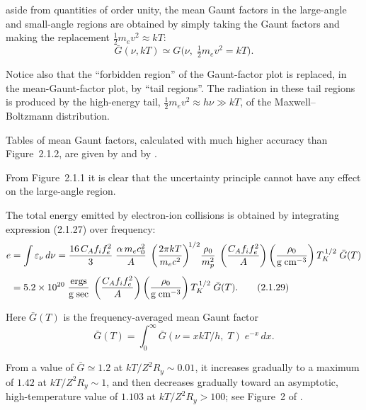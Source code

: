 aside from quantities of order unity, the mean Gaunt factors in the large-angle
and small-angle regions are obtained by simply taking the Gaunt
factors and making the replacement $\frac{1}{2}m_e v^2 \approx kT$:
\begin{equation}
\bar{G}(\nu,kT) \simeq G\bigl(\nu,\;\tfrac{1}{2}m_e v^2 = kT\bigr).
\end{equation}

Notice also that the ``forbidden region'' of the Gaunt-factor plot is replaced, in
the mean-Gaunt-factor plot, by ``tail regions''.  The radiation in these tail regions
is produced by the high-energy tail, $\frac{1}{2}m_e v^2 \approx h\nu \gg kT$, of the Maxwell--Boltzmann
distribution.

Tables of mean Gaunt factors, calculated with much higher accuracy than
Figure~2.1.2, are given by \citet{Green1959} and by \citet{Karzas1961}.

From Figure~2.1.1 it is clear that the uncertainty principle cannot have any
effect on the large-angle region.


The total energy emitted by electron-ion collisions is obtained by integrating
expression (2.1.27) over frequency:
\begin{align}
e &= \int \varepsilon_\nu\,d\nu
= \frac{16\,C_A f_i f_e^2}{3}\;
\frac{\alpha\,m_e c^2_0}{A}\;
\left(\frac{2\pi kT}{m_e c^2}\right)^{\!1/2}\!
\frac{\rho_0}{m_p^2}\;
\left(\frac{C_A f_i f_e^2}{A}\right)
\left(\frac{\rho_0}{\text{g\;cm}^{-3}}\right)
T_K^{\,1/2}\;\bar{G}(T)
\notag\\[4pt]
&= 5.2 \times 10^{20}\;
\frac{\text{ergs}}{\text{g\;sec}}\;
\left(\frac{C_A f_i f_e^2}{A}\right)
\left(\frac{\rho_0}{\text{g\;cm}^{-3}}\right)
T_K^{\,1/2}\;\bar{G}(T).
\tag{2.1.29}
\end{align}

Here $\bar{G}(T)$ is the frequency-averaged mean Gaunt factor
\begin{equation}
\bar{G}(T) = \int_0^\infty \bar{G}(\nu = xkT/h,\;T)\;e^{-x}\,dx.
\tag{2.1.30}
\end{equation}

From a value of $\bar{G} \simeq 1.2$ at $kT/Z^2 R_y \sim 0.01$, it increases gradually to a maximum
of $1.42$ at $kT/Z^2 R_y \sim 1$, and then decreases gradually toward an asymptotic,
high-temperature value of $1.103$ at $kT/Z^2 R_y > 100$; see Figure~2 of \citet{Green1959}.

